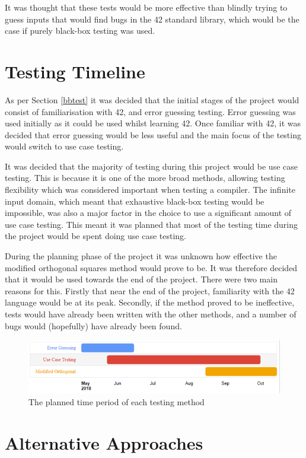 It was thought that these tests would be more effective than blindly trying to guess inputs that would find bugs in the 42 standard library, which would be the case if purely black-box testing was used.


\section{Testing Timeline \label{planTiming}}

As per Section \ref{bbtest} it was decided that the initial stages of the project would consist of familiarisation with 42, and error guessing testing. Error guessing was used initially as it could be used whilst learning 42. Once familiar with 42, it was decided that error guessing would be less useful and the main focus of the testing would switch to use case testing.

It was decided that the majority of testing during this project would be use case testing. This is because it is one of the more broad methods, allowing testing flexibility which was considered important when testing a compiler. The infinite input domain, which meant that exhaustive black-box testing would be impossible, was also a major factor in the choice to use a significant amount of use case testing. This meant it was planned that most of the testing time during the project would be spent doing use case testing. 

During the planning phase of the project it was unknown how effective the modified orthogonal squares method would prove to be. It was therefore decided that it would be used towards the end of the project. There were two main reasons for this. Firstly that near the end of the project, familiarity with the 42 language would be at its peak. Secondly, if the method proved to be ineffective, tests would have already been written with the other methods, and a number of bugs would (hopefully) have already been found.

\begin{figure}[h]
\includegraphics{nis2}
\caption{The planned time period of each testing method}
\end{figure}


\section{Alternative Approaches}

